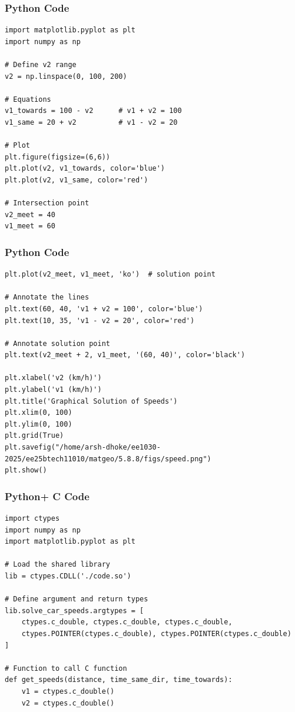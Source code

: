 \documentclass{beamer}
\begin{document}
\begin{frame}[fragile]
    \frametitle{Python Code}
\begin{lstlisting}
import matplotlib.pyplot as plt
import numpy as np

# Define v2 range
v2 = np.linspace(0, 100, 200)

# Equations
v1_towards = 100 - v2      # v1 + v2 = 100
v1_same = 20 + v2          # v1 - v2 = 20

# Plot
plt.figure(figsize=(6,6))
plt.plot(v2, v1_towards, color='blue')
plt.plot(v2, v1_same, color='red')

# Intersection point
v2_meet = 40
v1_meet = 60
\end{lstlisting}
\end{frame}

\begin{frame}[fragile]
    \frametitle{Python Code}
\begin{lstlisting}
plt.plot(v2_meet, v1_meet, 'ko')  # solution point

# Annotate the lines
plt.text(60, 40, 'v1 + v2 = 100', color='blue')
plt.text(10, 35, 'v1 - v2 = 20', color='red')

# Annotate solution point
plt.text(v2_meet + 2, v1_meet, '(60, 40)', color='black')

plt.xlabel('v2 (km/h)')
plt.ylabel('v1 (km/h)')
plt.title('Graphical Solution of Speeds')
plt.xlim(0, 100)
plt.ylim(0, 100)
plt.grid(True)
plt.savefig("/home/arsh-dhoke/ee1030-2025/ee25btech11010/matgeo/5.8.8/figs/speed.png")
plt.show()

\end{lstlisting}
\end{frame}

\begin{frame}[fragile]
    \frametitle{Python+ C Code}
\begin{lstlisting}
import ctypes
import numpy as np
import matplotlib.pyplot as plt

# Load the shared library
lib = ctypes.CDLL('./code.so')

# Define argument and return types
lib.solve_car_speeds.argtypes = [
    ctypes.c_double, ctypes.c_double, ctypes.c_double,
    ctypes.POINTER(ctypes.c_double), ctypes.POINTER(ctypes.c_double)
]

# Function to call C function
def get_speeds(distance, time_same_dir, time_towards):
    v1 = ctypes.c_double()
    v2 = ctypes.c_double()
    \end{lstlisting}
\end{frame}
\end{document}

